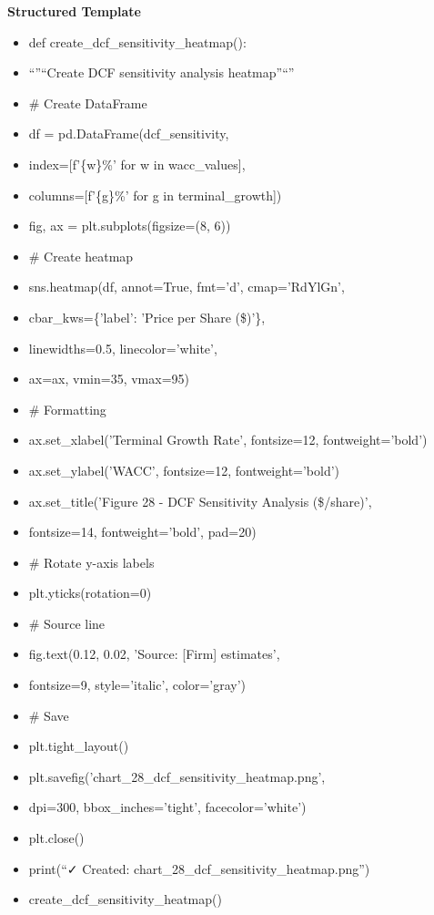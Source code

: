 \documentclass[11pt]{article}
\begin{document}
\textbf{Structured Template}
\begin{itemize}[leftmargin=*,itemsep=2pt,topsep=2pt]
\item {} def create\_\allowbreak{}dcf\_\allowbreak{}sensitivity\_\allowbreak{}heatmap():
\item {} ``''``Create DCF sensitivity analysis heatmap''``''
\item {} \# Create DataFrame
\item {} df = pd.DataFrame(dcf\_\allowbreak{}sensitivity,
\item {} index=[f'\{w\}\%' for w in wacc\_\allowbreak{}values],
\item {} columns=[f'\{g\}\%' for g in terminal\_\allowbreak{}growth])
\item {} fig, ax = plt.subplots(figsize=(8, 6))
\item {} \# Create heatmap
\item {} sns.heatmap(df, annot=True, fmt='d', cmap='RdYlGn',
\item {} cbar\_\allowbreak{}kws=\{'label': 'Price per Share (\$)'\},
\item {} linewidths=0.5, linecolor='white',
\item {} ax=ax, vmin=35, vmax=95)
\item {} \# Formatting
\item {} ax.set\_\allowbreak{}xlabel('Terminal Growth Rate', fontsize=12, fontweight='bold')
\item {} ax.set\_\allowbreak{}ylabel('WACC', fontsize=12, fontweight='bold')
\item {} ax.set\_\allowbreak{}title('Figure 28 - DCF Sensitivity Analysis (\$/share)',
\item {} fontsize=14, fontweight='bold', pad=20)
\item {} \# Rotate y-axis labels
\item {} plt.yticks(rotation=0)
\item {} \# Source line
\item {} fig.text(0.12, 0.02, 'Source: [Firm] estimates',
\item {} fontsize=9, style='italic', color='gray')
\item {} \# Save
\item {} plt.tight\_\allowbreak{}layout()
\item {} plt.savefig('chart\_\allowbreak{}28\_\allowbreak{}dcf\_\allowbreak{}sensitivity\_\allowbreak{}heatmap.png',
\item {} dpi=300, bbox\_\allowbreak{}inches='tight', facecolor='white')
\item {} plt.close()
\item {} print(``✓ Created: chart\_\allowbreak{}28\_\allowbreak{}dcf\_\allowbreak{}sensitivity\_\allowbreak{}heatmap.png'')
\item {} create\_\allowbreak{}dcf\_\allowbreak{}sensitivity\_\allowbreak{}heatmap()
\end{itemize}
\end{document}
